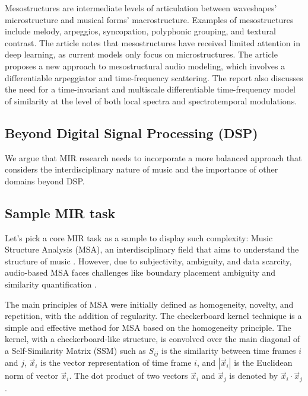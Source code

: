 
Mesostructures \cite{Mesostructures2023} are intermediate levels of articulation between waveshapes' microstructure and musical forms' macrostructure. Examples of mesostructures include melody, arpeggios, syncopation, polyphonic grouping, and textural contrast. The article notes that mesostructures have received limited attention in deep learning, as current models only focus on microstructures. The article proposes a new approach to mesostructural audio modeling, which involves a differentiable arpeggiator and time-frequency scattering. The report also discusses the need for a time-invariant and multiscale differentiable time-frequency model of similarity at the level of both local spectra and spectrotemporal modulations.

\subsection{Beyond Digital Signal Processing (DSP)}

We argue that MIR research needs to incorporate a more balanced approach that considers the interdisciplinary nature of music and the importance of other domains beyond DSP.

\subsection{Sample MIR task}

Let's pick a core MIR task as a sample to display such complexity: Music Structure Analysis (MSA), an interdisciplinary field that aims to understand the structure of music \cite{Nieto2020Audio-BasedApplications}. However, due to subjectivity, ambiguity, and data scarcity, audio-based MSA faces challenges like boundary placement ambiguity and similarity quantification \cite{NietoPerceptualMusic}. 

The main principles of MSA were initially defined as homogeneity, novelty, and repetition, with the addition of regularity. The checkerboard kernel technique is a simple and effective method for MSA based on the homogeneity principle. The kernel, with a checkerboard-like structure, is convolved over the main diagonal of a Self-Similarity Matrix (SSM) such as $S_{ij}$ is the similarity between time frames $i$ and $j$, $\vec{x}_i$ is the vector representation of time frame $i$, and $\left| \vec{x}_i \right|$ is the Euclidean norm of vector $\vec{x}_i$. The dot product of two vectors $\vec{x}_i$ and $\vec{x}_j$ is denoted by $\vec{x}_i \cdot \vec{x}_j$.

